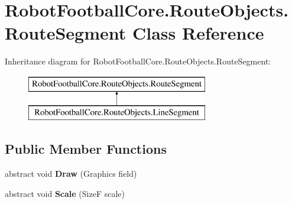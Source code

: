 \hypertarget{class_robot_football_core_1_1_route_objects_1_1_route_segment}{\section{Robot\-Football\-Core.\-Route\-Objects.\-Route\-Segment Class Reference}
\label{class_robot_football_core_1_1_route_objects_1_1_route_segment}
}
Inheritance diagram for Robot\-Football\-Core.\-Route\-Objects.\-Route\-Segment\-:\begin{figure}[H]
\begin{center}
\leavevmode
\includegraphics[height=2.000000cm]{class_robot_football_core_1_1_route_objects_1_1_route_segment}
\end{center}
\end{figure}
\subsection*{Public Member Functions}
\begin{DoxyCompactItemize}
\item 
\hypertarget{class_robot_football_core_1_1_route_objects_1_1_route_segment_a07ecaa6be75491087a036168f6dccdb7}{abstract void {\bfseries Draw} (Graphics field)}\label{class_robot_football_core_1_1_route_objects_1_1_route_segment_a07ecaa6be75491087a036168f6dccdb7}

\item 
\hypertarget{class_robot_football_core_1_1_route_objects_1_1_route_segment_aefbf978ae9c093fa3a1118ae27e695f6}{abstract void {\bfseries Scale} (Size\-F scale)}\label{class_robot_football_core_1_1_route_objects_1_1_route_segment_aefbf978ae9c093fa3a1118ae27e695f6}

\end{DoxyCompactItemize}
